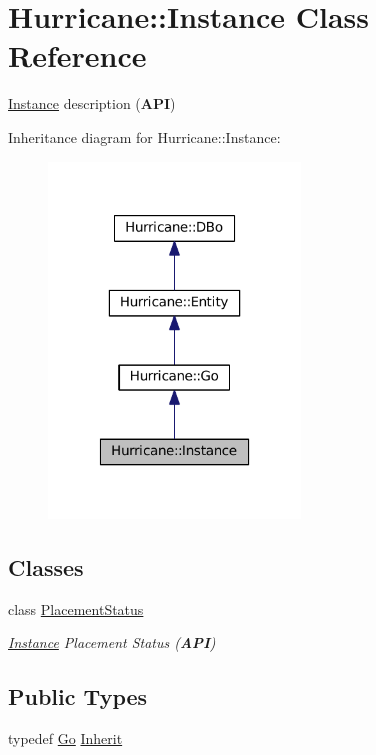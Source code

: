 \hypertarget{classHurricane_1_1Instance}{}\section{Hurricane\+:\+:Instance Class Reference}
\label{classHurricane_1_1Instance}


\mbox{\hyperlink{classHurricane_1_1Instance}{Instance}} description ({\bfseries A\+PI})  




Inheritance diagram for Hurricane\+:\+:Instance\+:\nopagebreak
\begin{figure}[H]
\begin{center}
\leavevmode
\includegraphics[width=190pt]{classHurricane_1_1Instance__inherit__graph}
\end{center}
\end{figure}
\subsection*{Classes}
\begin{DoxyCompactItemize}
\item 
class \mbox{\hyperlink{classHurricane_1_1Instance_1_1PlacementStatus}{Placement\+Status}}
\begin{DoxyCompactList}\small\item\em \mbox{\hyperlink{classHurricane_1_1Instance}{Instance}} Placement Status ({\bfseries A\+PI}) \end{DoxyCompactList}\end{DoxyCompactItemize}
\subsection*{Public Types}
\begin{DoxyCompactItemize}
\item 
typedef \mbox{\hyperlink{classHurricane_1_1Go}{Go}} \mbox{\hyperlink{classHurricane_1_1Instance_a227e1f98670e466328ca95fe45546590}{Inherit}}
\end{DoxyCompactItemize}
